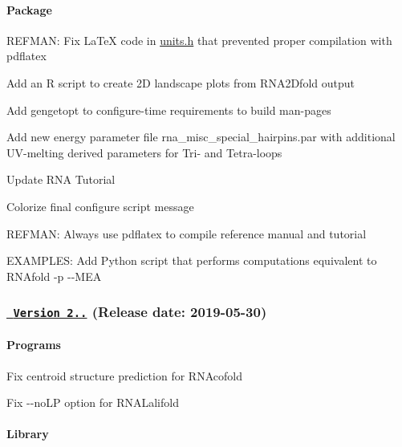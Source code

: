 \paragraph*{Package}


\begin{DoxyItemize}
\item R\+E\+F\+M\+AN\+: Fix La\+TeX code in {\ttfamily \mbox{\hyperlink{units_8h}{units.\+h}}} that prevented proper compilation with {\ttfamily pdflatex}
\item Add an R script to create 2D landscape plots from {\ttfamily R\+N\+A2\+Dfold} output
\item Add {\ttfamily gengetopt} to configure-\/time requirements to build man-\/pages
\item Add new energy parameter file {\ttfamily rna\+\_\+misc\+\_\+special\+\_\+hairpins.\+par} with additional U\+V-\/melting derived parameters for Tri-\/ and Tetra-\/loops
\item Update R\+NA Tutorial
\item Colorize final configure script message
\item R\+E\+F\+M\+AN\+: Always use {\ttfamily pdflatex} to compile reference manual and tutorial
\item E\+X\+A\+M\+P\+L\+ES\+: Add Python script that performs computations equivalent to {\ttfamily R\+N\+Afold -\/p -\/-\/M\+EA}
\end{DoxyItemize}

\subsubsection*{\href{https://github.com/ViennaRNA/ViennaRNA/compare/v2.4.12...v2.4.13}{\texttt{ Version 2..}} (Release date\+: 2019-\/05-\/30)}

\paragraph*{Programs}


\begin{DoxyItemize}
\item Fix centroid structure prediction for {\ttfamily R\+N\+Acofold}
\item Fix {\ttfamily -\/-\/no\+LP} option for {\ttfamily R\+N\+A\+Lalifold}
\end{DoxyItemize}

\paragraph*{Library}


